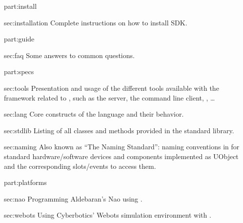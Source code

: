 \begin{partDescription}{part:install}
\item[sec:installation]
  Complete instructions on how to install \urbi SDK.
\end{partDescription}

\begin{partDescription}{part:guide}
\item[sec:faq]
  Some answers to common questions.
\end{partDescription}

\begin{partDescription}{part:specs}
\item[sec:tools]
  Presentation and usage of the different tools available with the
  \urbi framework related to \us, such as the \urbi server, the
  command line client, \umake, \ldots

\item[sec:lang]
  Core constructs of the language and their behavior.

\item[sec:stdlib]
  Listing of all classes and methods provided in the standard library.

\item[sec:naming]
  Also known as ``The \urbi Naming Standard'': naming conventions in
  for standard hardware/software devices and components implemented as
  UObject and the corresponding slots/events to access them.

\end{partDescription}

\begin{partDescription}{part:platforms}
\item[sec:nao]
  Programming Aldebaran's Nao using \urbi.

\item[sec:webots] Using Cyberbotics' Webots simulation environment
  with \urbi.
\end{partDescription}



